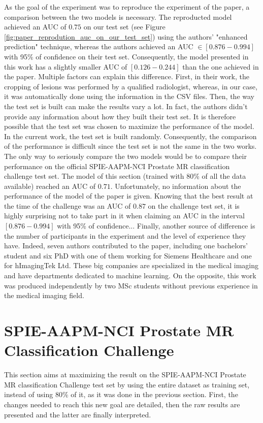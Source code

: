 As the goal of the experiment was to reproduce the experiment of the paper, a comparison between the two models is necessary. The reproducted model achieved an AUC of $0.75$ on our test set (see Figure \ref{fig:paper_reprodution_auc_on_our_test_set}) using the authors' "enhanced prediction" technique, whereas the authors achieved an AUC $\in [0.876-0.994]$ with 95\% of confidence on their test set. Consequently, the model presented in this work has a slightly smaller AUC of $[0.126-0.244]$ than the one achieved in the paper. Multiple factors can explain this difference. First, in their work, the cropping of lesions was performed by a qualified radiologist, whereas, in our case, it was automatically done using the information in the CSV files. Then, the way the test set is built can make the results vary a lot. In fact, the authors didn't provide any information about how they built their test set. It is therefore possible that the test set was chosen to maximize the performance of the model. In the current work, the test set is built randomly. Consequently, the comparison of the performance is difficult since the test set is not the same in the two works. The only way to seriously compare the two models would be to compare their performance on the official SPIE-AAPM-NCI Prostate MR classification challenge test set. The model of this section (trained with 80\% of all the data available) reached an AUC of $0.71$. Unfortunately, no information about the performance of the model of the paper is given. Knowing that the best result at the time of the challenge was an AUC of $0.87$ on the challenge test set, it is highly surprising not to take part in it when claiming an AUC in the interval $[0.876-0.994]$ with 95\% of confidence... Finally, another source of difference is the number of participants in the experiment and the level of experience they have. Indeed, seven authors contributed to the paper, including one bachelors' student and six PhD with one of them working for Siemens Healthcare and one for hImagingTek Ltd. These big companies are specialized in the medical imaging and have departments dedicated to machine learning. On the opposite, this work was produced independently by two MSc students without previous experience in the medical imaging field. 

\section{SPIE-AAPM-NCI Prostate MR Classification Challenge}
\label{sec:classification_challenge}
\setlength{\marginparwidth}{3cm}\leavevmode {}This section aims at maximizing the result on the SPIE-AAPM-NCI Prostate MR classification Challenge test set by using the entire dataset as training set, instead of using 80\% of it, as it was done in the previous section. First, the changes needed to reach this new goal are detailed, then the raw results are presented and the latter are finally interpreted.


